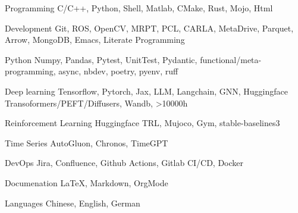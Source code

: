 \documentclass[../cv.tex]{subfiles}
\begin{document}


\begin{cvskills}

  \cvskill
    {Programming} %
    {C/C++, Python, Shell, Matlab, CMake, Rust, Mojo, Html} %

  \cvskill
    {Development} %
    {Git, ROS, OpenCV, MRPT, PCL, CARLA, MetaDrive, Parquet, Arrow, MongoDB, Emacs, Literate Programming} %

  \cvskill
    {Python} %
    {Numpy, Pandas, Pytest, UnitTest, Pydantic, functional/meta-programming, async, nbdev, poetry, pyenv, ruff} %

  \cvskill
    {Deep learning} %
    {Tensorflow, Pytorch, Jax, LLM, Langchain, GNN, Huggingface Transoformers/PEFT/Diffusers, Wandb, >10000h} %

  \cvskill
    {Reinforcement Learning} %
    {Huggingface TRL, Mujoco, Gym, stable-baselines3} %

  \cvskill
    {Time Series} %
    {AutoGluon, Chronos, TimeGPT} %

  \cvskill
    {DevOps} %
    {Jira, Confluence, Github Actions, Gitlab CI/CD, Docker} %

  \cvskill
    {Documenation} %
    {LaTeX, Markdown, OrgMode} %

  \cvskill
    {Languages} %
    {Chinese, English, German} %

\end{cvskills}
\end{document}
